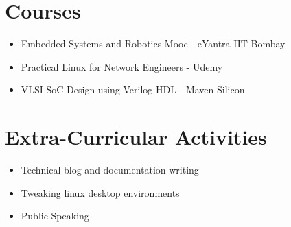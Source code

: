 \documentclass[paper=a4, fontsize=10pt]{my-resume}
\begin{document}
{    \section[\faMortarBoard]{Courses}
     \begin{itemize}
        \item Embedded Systems and Robotics Mooc - eYantra IIT Bombay
        \item Practical Linux for Network Engineers - Udemy
        \item VLSI SoC Design using Verilog HDL - Maven Silicon
     \end{itemize}

    \section[\faPencil]{Extra-Curricular Activities}
     \begin{itemize}
         \item Technical blog and documentation writing
         \item Tweaking linux desktop environments
         \item Public Speaking
     \end{itemize}

}
\makebody
\clearpage
\end{document}
